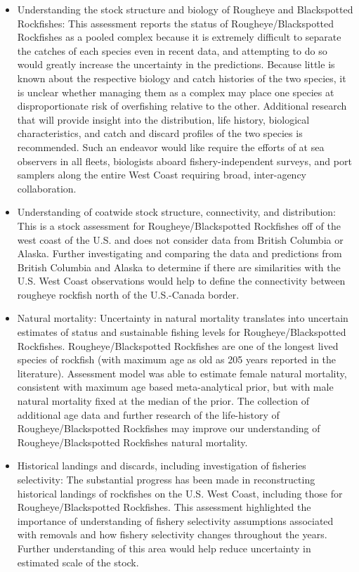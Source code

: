 \documentclass[
]{scrartcl}
\begin{document}
\begin{itemize}
\item
  Understanding the stock structure and biology of Rougheye and
  Blackspotted Rockfishes: This assessment reports the status of
  Rougheye/Blackspotted Rockfishes as a pooled complex because it is
  extremely difficult to separate the catches of each species even in
  recent data, and attempting to do so would greatly increase the
  uncertainty in the predictions. Because little is known about the
  respective biology and catch histories of the two species, it is
  unclear whether managing them as a complex may place one species at
  disproportionate risk of overfishing relative to the other. Additional
  research that will provide insight into the distribution, life
  history, biological characteristics, and catch and discard profiles of
  the two species is recommended. Such an endeavor would like require
  the efforts of at sea observers in all fleets, biologists aboard
  fishery-independent surveys, and port samplers along the entire West
  Coast requiring broad, inter-agency collaboration.
\item
  Understanding of coatwide stock structure, connectivity, and
  distribution: This is a stock assessment for Rougheye/Blackspotted
  Rockfishes off of the west coast of the U.S. and does not consider
  data from British Columbia or Alaska. Further investigating and
  comparing the data and predictions from British Columbia and Alaska to
  determine if there are similarities with the U.S. West Coast
  observations would help to define the connectivity between rougheye
  rockfish north of the U.S.-Canada border.
\item
  Natural mortality: Uncertainty in natural mortality translates into
  uncertain estimates of status and sustainable fishing levels for
  Rougheye/Blackspotted Rockfishes. Rougheye/Blackspotted Rockfishes are
  one of the longest lived species of rockfish (with maximum age as old
  as 205 years reported in the literature). Assessment model was able to
  estimate female natural mortality, consistent with maximum age based
  meta-analytical prior, but with male natural mortality fixed at the
  median of the prior. The collection of additional age data and further
  research of the life-history of Rougheye/Blackspotted Rockfishes may
  improve our understanding of Rougheye/Blackspotted Rockfishes natural
  mortality.
\item
  Historical landings and discards, including investigation of fisheries
  selectivity: The substantial progress has been made in reconstructing
  historical landings of rockfishes on the U.S. West Coast, including
  those for Rougheye/Blackspotted Rockfishes. This assessment
  highlighted the importance of understanding of fishery selectivity
  assumptions associated with removals and how fishery selectivity
  changes throughout the years. Further understanding of this area would
  help reduce uncertainty in estimated scale of the stock.
\end{itemize}
\end{document}
